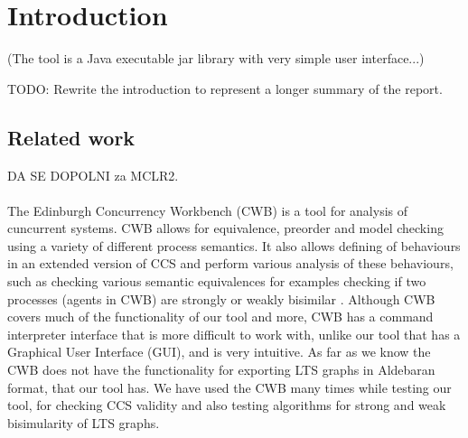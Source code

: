 \section{Introduction}

(The tool is a Java executable jar library with very simple user interface...)

TODO: Rewrite the introduction to represent a longer summary of the report. 

\subsection{Related work} DA SE DOPOLNI za MCLR2. 
\\\\

The Edinburgh Concurrency Workbench (CWB) is a tool for analysis of cuncurrent systems. CWB allows for equivalence, preorder and model checking using a variety of different process semantics. It also allows defining of behaviours in an extended version of CCS and perform various analysis of these behaviours, such as checking various semantic equivalences for examples checking if two processes (agents in CWB) are strongly or weakly bisimilar \cite{CWB}. 
Although CWB covers much of the functionality of our tool and more, CWB has a command interpreter interface that is more difficult to work with, unlike our tool that has a Graphical User Interface (GUI), and is very intuitive. As far as we know the CWB does not have the functionality for exporting LTS graphs in Aldebaran format, that our tool has. We have used the CWB many times while testing our tool, for checking CCS validity and also testing algorithms for strong and weak bisimularity of LTS graphs. 
 
